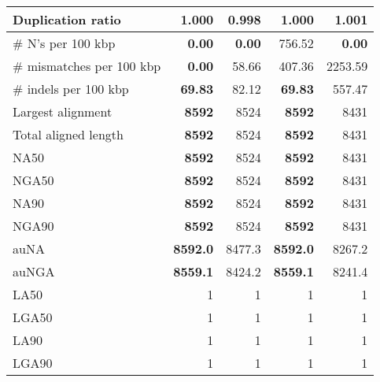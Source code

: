 \documentclass[12pt,a4paper]{article}
\begin{document}
\begin{table}[ht]
\begin{center}
\begin{tabular}{|l*{4}{|r}|}
Duplication ratio & 1.000 & {\bf 0.998} & 1.000 & 1.001 \\ \hline
\# N's per 100 kbp & {\bf 0.00} & {\bf 0.00} & 756.52 & {\bf 0.00} \\ \hline
\# mismatches per 100 kbp & {\bf 0.00} & 58.66 & 407.36 & 2253.59 \\ \hline
\# indels per 100 kbp & {\bf 69.83} & 82.12 & {\bf 69.83} & 557.47 \\ \hline
Largest alignment & {\bf 8592} & 8524 & {\bf 8592} & 8431 \\ \hline
Total aligned length & {\bf 8592} & 8524 & {\bf 8592} & 8431 \\ \hline
NA50 & {\bf 8592} & 8524 & {\bf 8592} & 8431 \\ \hline
NGA50 & {\bf 8592} & 8524 & {\bf 8592} & 8431 \\ \hline
NA90 & {\bf 8592} & 8524 & {\bf 8592} & 8431 \\ \hline
NGA90 & {\bf 8592} & 8524 & {\bf 8592} & 8431 \\ \hline
auNA & {\bf 8592.0} & 8477.3 & {\bf 8592.0} & 8267.2 \\ \hline
auNGA & {\bf 8559.1} & 8424.2 & {\bf 8559.1} & 8241.4 \\ \hline
LA50 & 1 & 1 & 1 & 1 \\ \hline
LGA50 & 1 & 1 & 1 & 1 \\ \hline
LA90 & 1 & 1 & 1 & 1 \\ \hline
LGA90 & 1 & 1 & 1 & 1 \\ \hline
\end{tabular}
\end{center}
\end{table}
\end{document}
